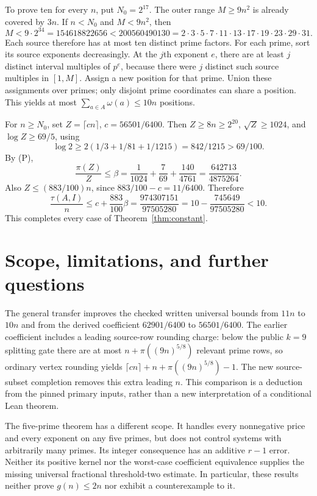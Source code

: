 \documentclass[11pt,a4paper]{article}
\begin{document}
To prove ten for every $n$, put $N_0=2^{17}$.
The outer range $M\ge9n^2$ is already covered by $3n$.
If $n<N_0$ and $M<9n^2$, then
\[
 M<9\cdot2^{34}=154618822656
  <200560490130=2\cdot3\cdot5\cdot7\cdot11\cdot13\cdot17
                  \cdot19\cdot23\cdot29\cdot31.
\]
Each source therefore has at most ten distinct prime factors.
For each prime, sort its source exponents decreasingly. At the $j$th
exponent $e$, there are at least $j$ distinct interval multiples of $p^e$,
because there were $j$ distinct such source multiples in $[1,M]$.
Assign a new position for that prime. Union these assignments over primes;
only disjoint prime coordinates can share a position.
This yields at most $\sum_{a\in A}\omega(a)\le10n$ positions.

For $n\ge N_0$, set $Z=\lceil cn\rceil$, $c=56501/6400$.
Then $Z\ge8n\ge2^{20}$, $\sqrt Z\ge1024$, and $\log Z\ge69/5$,
using
\[
 \log2\ge2(1/3+1/81+1/1215)=842/1215>69/100.
\]
By (P),
\[
 \frac{\pi(Z)}Z\le
 \beta=\frac1{1024}+\frac7{69}+\frac{140}{4761}
      =\frac{642713}{4875264}.
\]
Also $Z\le(883/100)n$, since $883/100-c=11/6400$.
Therefore
\[
 \frac{\tau(A,I)}n\le c+\frac{883}{100}\beta
 =\frac{974307151}{97505280}
 =10-\frac{745649}{97505280}<10.
\]
This completes every case of Theorem~\ref{thm:constant}.




\section{Scope, limitations, and further questions}
The general transfer improves the checked written universal bounds from $11n$ to $10n$ and from the derived coefficient $62901/6400$ to $56501/6400$. The earlier coefficient includes a leading source-row rounding charge: below the public $k=9$ splitting gate there are at most $n+\pi((9n)^{5/8})$ relevant prime rows, so ordinary vertex rounding yields $\lceil cn\rceil+n+\pi((9n)^{5/8})-1$. The new source-subset completion removes this extra leading $n$. This comparison is a deduction from the pinned primary inputs, rather than a new interpretation of a conditional Lean theorem.

The five-prime theorem has a different scope. It handles every nonnegative price and every exponent on any five primes, but does not control systems with arbitrarily many primes. Its integer consequence has an additive $r-1$ error. Neither its positive kernel nor the worst-case coefficient equivalence supplies the missing universal fractional threshold-two estimate. In particular, these results neither prove $g(n)\le2n$ nor exhibit a counterexample to it.
\end{document}
